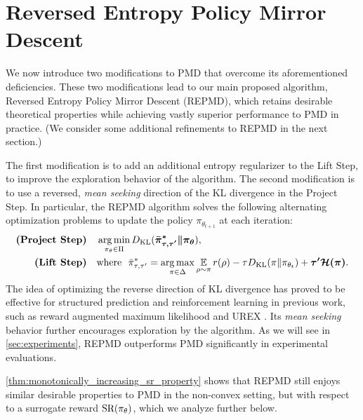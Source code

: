 

\section{Reversed Entropy Policy Mirror Descent}
\label{subsec:repmd}

We now introduce two modifications to PMD that overcome 
its aforementioned deficiencies.
These two modifications lead to our main proposed algorithm,
Reversed Entropy Policy Mirror Descent (REPMD),
which retains desirable theoretical properties while achieving
vastly superior performance to PMD in practice.
(We consider some additional refinements to REPMD in the next section.)

The first modification is to add an additional entropy regularizer
to the Lift Step,
to improve the exploration behavior of the algorithm. 
The second modification is to use a reversed, \emph{mean seeking} direction
of the KL divergence in the Project Step.
In particular, the REPMD algorithm solves the following 
alternating
optimization problems to update the policy $\pi_{\theta_{t+1}}$
at each iteration:
%
\begin{equation}
\label{eq:repmd}
\begin{split}
\text{\bf (Project Step)} \quad  &\argmin\limits_{\pi_\theta \in \Pi}{\KL(\bm{ \bar{\pi}_{\tau,\tau^{\prime}}^* \| \pi_\theta }) }, \\
\text{\bf (Lift Step)} \quad  & \text{where}\ \ \bar{\pi}_{\tau,\tau^{\prime}}^*  =  \argmax\limits_{\pi \in \Delta}{ \ep\limits_{\rho \sim \pi}{  r(\rho)  - \tau \KL(\pi \| \pi_{\theta_t}) + \bm{\tau^{\prime} \cH(\pi)} }}.
\end{split}
\end{equation}
%
The idea of optimizing the reverse direction of KL divergence has proved
to be effective for structured prediction and reinforcement learning
in previous work,
such as reward augmented maximum likelihood \citep{norouzi2016reward}
and UREX \citep{nachum2017improving}.
Its \emph{mean seeking} behavior further encourages exploration by the
algorithm.
As we will see in \cref{sec:experiments},
REPMD outperforms PMD significantly in experimental evaluations.

\cref{thm:monotonically_increasing_sr_property}
shows that REPMD still enjoys similar desirable properties to PMD
in the non-convex setting,
but with respect to a surrogate reward $\text{SR}(\pi_\theta)$,
which we analyze further below.

